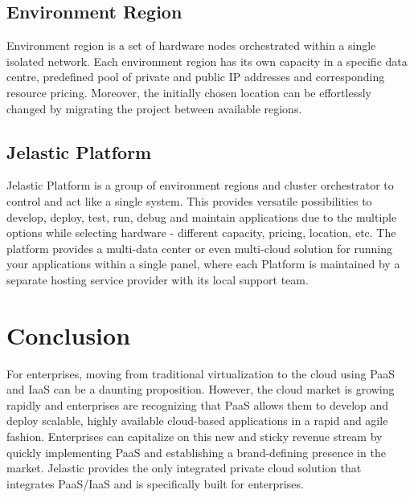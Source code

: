 \documentclass[9pt,twocolumn,twoside]{styles/osajnl}
\begin{document}
\subsection{Environment Region}
Environment region is a set of hardware nodes orchestrated within a single
isolated network. Each environment region has its own capacity in a specific
data centre, predefined pool of private and public IP addresses and \cite{paper-jelastic2}
corresponding resource pricing. Moreover, the initially chosen location can be
effortlessly changed by migrating the project between available regions.\cite{www-jelastic4}


\subsection{Jelastic Platform}
Jelastic Platform is a group of environment regions and cluster orchestrator to
control and act like a single system. This provides versatile possibilities to
develop, deploy, test, run, debug and maintain applications due to the multiple
options while selecting hardware - different capacity, pricing, location, etc.
The platform provides a multi-data center or even multi-cloud solution for
running your applications within a single panel, where each Platform is
maintained by a separate hosting service provider with its local support team.\cite{www-jelastic1}

\section{Conclusion}
For enterprises, moving from traditional virtualization to the cloud using PaaS
and IaaS can be a daunting proposition. However, the cloud market is growing 
rapidly and enterprises are recognizing that PaaS allows them to develop and 
deploy scalable, highly available cloud-based applications in a rapid and agile 
fashion. Enterprises can capitalize on this new and sticky revenue stream by 
quickly implementing PaaS and establishing a brand-defining presence in the 
market. Jelastic provides the only integrated private cloud solution that 
integrates PaaS/IaaS and is specifically built for enterprises.\cite{www-jelastic6}



\end{document}
